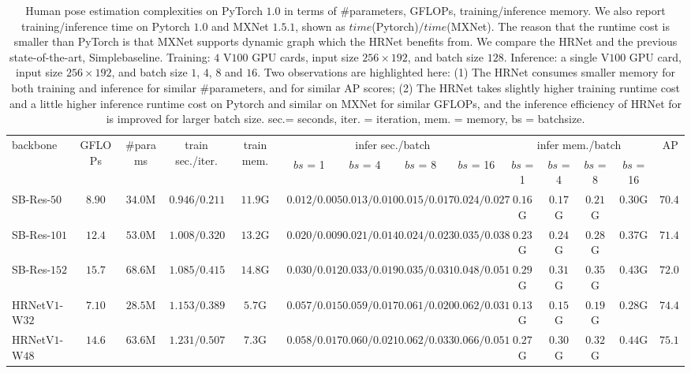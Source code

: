 \documentclass[10pt,journal,compsoc]{IEEEtran}
\begin{document}
\begin{table}[!h]
    \centering\setlength{\tabcolsep}{2pt}
    \scriptsize
    \caption{
    \footnotesize Human pose estimation complexities
    on PyTorch $1.0$
    in terms of \#parameters,
    GFLOPs, training/inference memory. We also report training/inference time on Pytorch $1.0$ and MXNet $1.5.1$, shown as $time$(Pytorch)$/time$(MXNet). The reason that the runtime cost is smaller than PyTorch is that MXNet supports dynamic graph
    which the HRNet benefits from.
    We compare the HRNet and the previous state-of-the-art, Simplebaseline. 
    Training: $4$ V$100$ GPU cards, input size $256\times192$,
    and batch size $128$.
    Inference: a single V$100$ GPU card,
    input size $256\times192$,
    and batch size $1$, $4$, $8$ and $16$.
    Two observations are highlighted here:
    (1) The HRNet consumes smaller memory for both training and inference
    for similar \#parameters,
    and for similar AP scores;
    (2) The HRNet takes slightly higher training runtime cost
    and a little higher inference runtime cost on Pytorch and similar on MXNet
    for similar GFLOPs,
    and the inference efficiency of HRNet for is improved
    for larger batch size.
    sec.= seconds, iter. = iteration, mem. = memory, bs = batchsize.}
    \label{tab:pytroch_pose_comparison}
    \begin{tabular}{l|cc|cc|cccc|cccc|c}
        \hline %
		\multirow{2}{*}{backbone} & \multirow{2}{*}{GFLOPs}  & \multirow{2}{*}{\#params} & \multirow{2}{*}{train sec./iter.} &\multirow{2}{*}{train mem.}& \multicolumn{4}{c|}{infer sec./batch} & \multicolumn{4}{c|}{infer mem./batch} & \multirow{2}{*}{$\operatorname{AP}$}  \\
		\cline{6-13}
		& & & & & $bs$ = 1 & $bs$ = 4 & $bs$ = 8 & $bs$ = 16 & $bs$ = 1 & $bs$ = 4 & $bs$ = 8 & $bs$ = 16 & \\
		\hline
        
        \hline
        SB-Res-$50$   & $8.90$ & $34.0$M & $0.946/0.211$ & $11.9$G & $0.012/0.005$ & $0.013/0.010$& $0.015/0.017$& $0.024/0.027$ & $0.16$G & $0.17$G & $0.21$G & $0.30$G &${70.4}$ \\
        SB-Res-$101$  & $12.4$ & $53.0$M & $1.008/0.320$ & $13.2$G & $0.020/0.009$ & $0.021/0.014$ & $0.024/0.023$ & $0.035/0.038$ & $0.23$G & $0.24$G & $0.28$G & $0.37$G &${71.4}$ \\
        SB-Res-$152$  & $15.7$ & $68.6$M & $1.085/0.415$ & $14.8$G & $0.030/0.012$ & $0.033/0.019$ & $0.035/0.031$ & $0.048/0.051$ & $0.29$G & $0.31$G & $0.35$G & $0.43$G &${72.0}$ \\
        \hline
        HRNetV$1$-W$32$  & $7.10$ & $28.5$M & $1.153/0.389$ & $5.7$G & $0.057/0.015$ & $0.059/0.017$ & $0.061/0.020$ & $0.062/0.031$ & $0.13$G & $0.15$G& $0.19$G & $0.28$G & $74.4$ \\
        HRNetV$1$-W$48$  & $14.6$ & $63.6$M & $1.231/0.507$ & $7.3$G & $0.058/0.017$ & $0.060/0.021$ & $0.062/0.033$& $0.066/0.051$ & $0.27$G & $0.30$G & $0.32$G & $0.44$G
        & $75.1$ \\
        \hline
    \end{tabular} 
\end{table}
\end{document}
